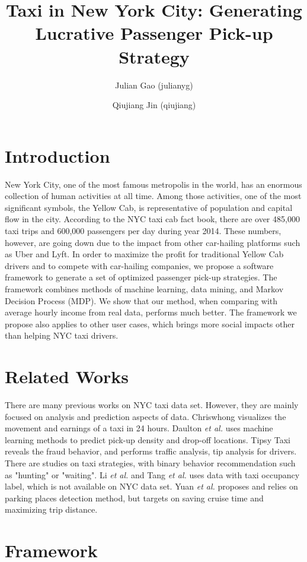 \documentclass[letterpaper, 10 pt, conference]{ieeeconf}
\title{\LARGE \bf Taxi in New York City: Generating Lucrative Passenger Pick-up Strategy}
\author[1]{Julian Gao (julianyg)}
\affil[1]{Stanford University \authorcr
  julianyg@stanford.edu}
\author[2]{Qiujiang Jin (qiujiang)}
\affil[2]{Stanford University \authorcr
  qiujiang@stanford.edu}
\begin{document}
\maketitle
\section{Introduction}
New York City, one of the most famous metropolis in the world, has an enormous collection of human activities at all time. Among those activities, one of the most significant symbols, the Yellow Cab, is representative of population and capital flow in the city. According to the NYC taxi cab fact book\cite{}, there are over 485,000 taxi trips and 600,000 passengers per day during year 2014. These numbers, however, are going down due to the impact from other car-hailing platforms such as Uber and Lyft. In order to maximize the profit for traditional Yellow Cab drivers and to compete with car-hailing companies, we propose a software framework to generate a set of optimized passenger pick-up strategies. The framework combines methods of machine learning, data mining, and Markov Decision Process (MDP). We show that our method, when comparing with average hourly income from real data, performs much better. The framework we propose also applies to other user cases, which brings more social impacts other than helping NYC taxi drivers.
\section{Related Works}
There are many previous works on NYC taxi data set. However, they are mainly focused on analysis and prediction aspects of data. Chriswhong visualizes the movement and earnings of a taxi in 24 hours\cite{}. Daulton \textit{et al.} uses machine learning methods to predict pick-up density and drop-off locations\cite{}. Tipsy Taxi reveals the fraud behavior, and performs traffic analysis, tip analysis for drivers\cite{}. There are studies on taxi strategies, with binary behavior recommendation such as "hunting" or "waiting". Li \textit{et al.} and Tang \textit{et al.} uses data with taxi occupancy label\cite{}, which is not available on NYC data set. Yuan \textit{et al.} proposes and relies on parking places detection method, but targets on saving cruise time and maximizing trip distance\cite{}. 
\section{Framework}
\end{document}
